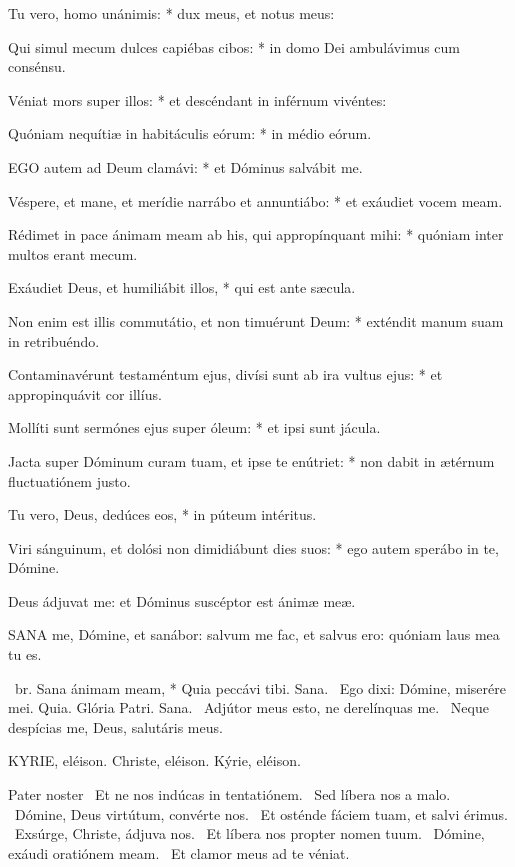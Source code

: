 Tu vero, homo unánimis: * dux meus, et notus meus:

Qui simul mecum dulces capiébas cibos: * in domo Dei ambulávimus cum consénsu.

Véniat mors super illos: * et descéndant in inférnum vivéntes:

Quóniam nequítiæ in habitáculis eórum: * in médio eórum.


\lettrine[lines=2]{E}{GO} autem ad Deum clamávi: * et Dóminus salvábit me.

Véspere, et mane, et merídie narrábo et annuntiábo: * et exáudiet vocem meam.

Rédimet in pace ánimam meam ab his, qui appropínquant mihi: * quóniam inter multos erant mecum.

Exáudiet Deus, et humiliábit illos, * qui est ante sæcula.

Non enim est illis commutátio, et non timuérunt Deum: * exténdit manum suam in retribuéndo.

Contaminavérunt testaméntum ejus, divísi sunt ab ira vultus ejus: * et appropinquávit cor illíus.

Mollíti sunt sermónes ejus super óleum: * et ipsi sunt jácula.

Jacta super Dóminum curam tuam, et ipse te enútriet: * non dabit in ætérnum fluctuatiónem justo.

Tu vero, Deus, dedúces eos, * in púteum intéritus.

Viri sánguinum, et dolósi non dimidiábunt dies suos: * ego autem sperábo in te, Dómine.

 Deus ádjuvat me: et Dóminus suscéptor est ánimæ meæ.



\lettrine[lines=2]{S}{ANA} me, Dómine, et sanábor: salvum me fac, et salvus ero: quóniam laus mea tu es.

\R\ br. Sana ánimam meam, * Quia peccávi tibi. Sana. \V\ Ego dixi: Dómine, miserére mei. Quia. Glória Patri. Sana. \V\ Adjútor meus esto, ne derelínquas me. \R\ Neque despícias me, Deus, salutáris meus.



KYRIE, eléison. Christe, eléison. Kýrie, eléison.

Pater noster  \V\ Et ne nos indúcas in tentatiónem. \R\ Sed líbera nos a malo. \V\ Dómine, Deus virtútum, convérte nos. \R\ Et osténde fáciem tuam, et salvi érimus. \V\ Exsúrge, Christe, ádjuva nos. \R\ Et líbera nos propter nomen tuum. \V\ Dómine, exáudi oratiónem meam. \R\ Et clamor meus ad te véniat.


